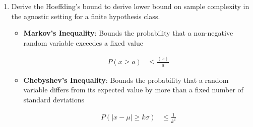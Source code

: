 \documentclass{article}
\newcommand{\abs}[1]{\left| #1\right|}
\newcommand{\Ex}[1]{\left< #1\right>}
\begin{document}
\begin{enumerate}
\begin{itemize}
{\em Proof:} Let $h$ be such a bad hypothesis with error $>\epsilon$. The probability that $h$ is consistant with one exapmle is $Pr(f(x)=h(x))<1-\epsilon$. 
\begin{align}
\intertext{The given training set consists of $m$ examples drawn independently so, the probability that $h$ is consistent with $m$ examples $<(1-\epsilon)^{m}$. From this, the probability that a bad hypothesis $\in H$ is consistent with no examples is $\abs{H}(1-\epsilon)^{m}$. We want to bound this and make it small, so we say}
\abs{H}(1-\epsilon)^{m} &< \delta\\
\ln\abs{H} + m\ln(1-\epsilon) &< \ln(\delta)
\intertext{We know that the Taylor Series Approximation of $e^{-x}=1-x+\frac{x^{2}}{2!}-\cdots$, so we can use this to approximate $(1-\epsilon)$ with a first order Taylor Series Approximation which can be seen as}
\ln\abs{H} + m\ln\left(e^{-\epsilon}\right) &< \ln(\delta)
\intertext{we can simplfiy the second term and move $\ln\abs{H}$ to the right hand side of the equation}
-\epsilon m\cdot\cancel{\ln(e)} &< \ln(\delta)-\ln\abs{H}
\intertext{In solving for the number of examples, $m$, we get}
m & > \frac{1}{\epsilon}\left(\ln\abs{H}-\ln(\delta)\right)
\end{align}
where the probability of a hypothesis $h\in H$ is consistent with a training set of size $m$ is $(1-\delta)$ and will have an error $< \epsilon$ on future examples. This is called {\em Occam's Razor} because it expresses a preference towards smaller hypothesis spaces.
\end{itemize}


\item Derive the Hoeffding's bound to derive lower bound on sample complexity in the agnostic setting for a finite hypothesis class.

\begin{itemize}
\item {\bf Markov's Inequality}: Bounds the probability that a non-negative random variable exceedes a fixed value

\begin{align}
P(x\geq a) &\leq \frac{\Ex{x}}{a}
\end{align}

\item {\bf Chebyshev's Inequality}: Bounds the probability that a random variable differs from its expected value by more than a fixed number of standard deviations

\begin{align}
P(\abs{x-\mu}\geq k\sigma) &\leq \frac{1}{k^{2}}
\end{align}


\end{itemize}
\end{enumerate}
\end{document}
